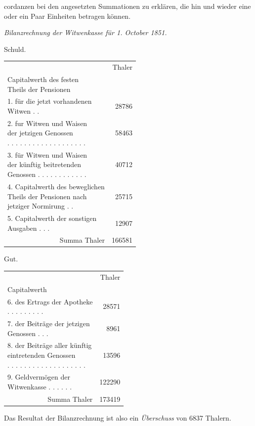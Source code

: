 cordanzen bei den angesetzten Summationen zu erklären, die hin und wieder eine oder ein Paar Einheiten betragen können.

\Needspace{210pt}
\begin{center}
\textit{Bilanzrechnung der Witwenkasse für 1. October 1851.}\par\smallskip
\footnotesize\setlength{\tabcolsep}{1pt}
\begin{minipage}[t]{.48\linewidth}
\centering
Schuld.\par
\begin{tabular}{l r}
&Thaler\\
\shortstack[l]{Capitalwerth des festen\\Theils der Pensionen}&\\
\shortstack[l]{1. für die jetzt vorhandenen\\Witwen . .}&28786\\
\shortstack[l]{2. fur Witwen und Waisen\\der jetzigen Genossen\\. . . . . . . . . . . . . . . . . . .}&58463\\
\shortstack[l]{3. für Witwen und Waisen\\der künftig beitretenden\\Genossen . . . . . . . . . . . .}&40712\\
\shortstack[l]{4. Capitalwerth des beweglichen\\Theils der Pensionen nach\\jetziger Normirung . .}&25715\\
\shortstack[l]{5. Capitalwerth der sonstigen\\Ausgaben . . .}&12907\\\cline{1-2}
\multicolumn{1}{r}{Summa Thaler}&166581
\end{tabular}
\end{minipage}\hfill\vrule\hfill
\begin{minipage}[t]{.48\linewidth}
\centering
Gut.\par
\begin{tabular}{l r}
&Thaler\\
Capitalwerth&\\
\shortstack[l]{6. des Ertrags der Apotheke\\. . . . . . . . .}&28571\\
\shortstack[l]{7. der Beiträge der jetzigen\\Genossen . . .}&8961\\
\shortstack[l]{8. der Beiträge aller künftig\\eintretenden Genossen\\. . . . . . . . . . . . . . . . . . .}&13596\\
\shortstack[l]{9. Geldvermögen der\\Witwenkasse . . . . . .}&122290\\\cline{1-2}
\multicolumn{1}{r}{Summa Thaler}&173419
\end{tabular}\par\medskip
Das Resultat der Bilanzrechnung ist also ein \textit{Überschuss} von 6837 Thalern.
\end{minipage}
\end{center}
